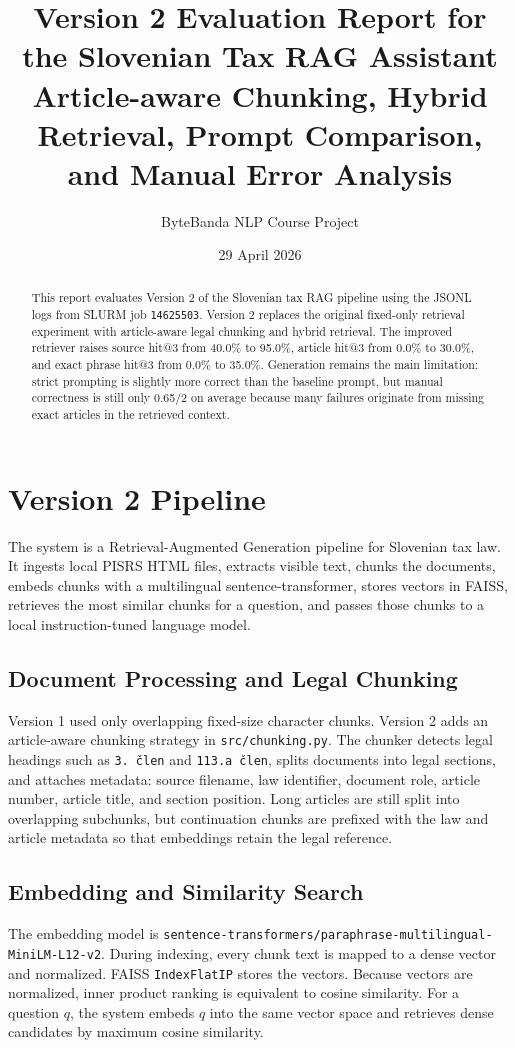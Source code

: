 \documentclass[11pt,a4paper]{article}
\title{\textbf{Version 2 Evaluation Report for the Slovenian Tax RAG Assistant}\\\large Article-aware Chunking, Hybrid Retrieval, Prompt Comparison, and Manual Error Analysis}
\author{ByteBanda NLP Course Project}
\date{29 April 2026}
\begin{document}
\maketitle
\begin{abstract}
This report evaluates Version 2 of the Slovenian tax RAG pipeline using the JSONL logs from SLURM job \texttt{14625503}. Version 2 replaces the original fixed-only retrieval experiment with article-aware legal chunking and hybrid retrieval. The improved retriever raises source hit@3 from 40.0\% to 95.0\%, article hit@3 from 0.0\% to 30.0\%, and exact phrase hit@3 from 0.0\% to 35.0\%. Generation remains the main limitation: strict prompting is slightly more correct than the baseline prompt, but manual correctness is still only 0.65/2 on average because many failures originate from missing exact articles in the retrieved context.
\end{abstract}
\section{Version 2 Pipeline}
The system is a Retrieval-Augmented Generation pipeline for Slovenian tax law. It ingests local PISRS HTML files, extracts visible text, chunks the documents, embeds chunks with a multilingual sentence-transformer, stores vectors in FAISS, retrieves the most similar chunks for a question, and passes those chunks to a local instruction-tuned language model.
\subsection{Document Processing and Legal Chunking}
Version 1 used only overlapping fixed-size character chunks. Version 2 adds an article-aware chunking strategy in \texttt{src/chunking.py}. The chunker detects legal headings such as \texttt{3. člen} and \texttt{113.a člen}, splits documents into legal sections, and attaches metadata: source filename, law identifier, document role, article number, article title, and section position. Long articles are still split into overlapping subchunks, but continuation chunks are prefixed with the law and article metadata so that embeddings retain the legal reference.
\subsection{Embedding and Similarity Search}
The embedding model is \texttt{sentence-transformers/paraphrase-multilingual-MiniLM-L12-v2}. During indexing, every chunk text is mapped to a dense vector and normalized. FAISS \texttt{IndexFlatIP} stores the vectors. Because vectors are normalized, inner product ranking is equivalent to cosine similarity. For a question $q$, the system embeds $q$ into the same vector space and retrieves dense candidates by maximum cosine similarity.
\end{document}
